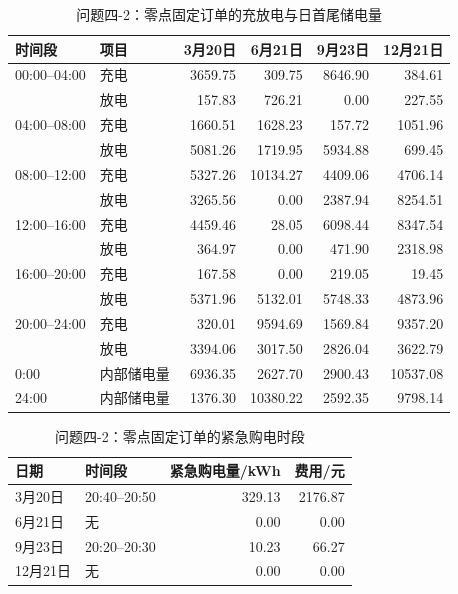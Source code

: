 \begin{table}[H]
\centering
\small
{}
\setlength{\tabcolsep}{5pt}
\caption{问题四-2：零点固定订单的充放电与日首尾储电量}
\label{tab:app42_storage}
\begin{tabular}{llrrrr}
\toprule
时间段 & 项目 & 3月20日 & 6月21日 & 9月23日 & 12月21日 \\
\midrule
00:00--04:00 & 充电 & 3659.75 & 309.75 & 8646.90 & 384.61 \\
 & 放电 & 157.83 & 726.21 & 0.00 & 227.55 \\
04:00--08:00 & 充电 & 1660.51 & 1628.23 & 157.72 & 1051.96 \\
 & 放电 & 5081.26 & 1719.95 & 5934.88 & 699.45 \\
08:00--12:00 & 充电 & 5327.26 & 10134.27 & 4409.06 & 4706.14 \\
 & 放电 & 3265.56 & 0.00 & 2387.94 & 8254.51 \\
12:00--16:00 & 充电 & 4459.46 & 28.05 & 6098.44 & 8347.54 \\
 & 放电 & 364.97 & 0.00 & 471.90 & 2318.98 \\
16:00--20:00 & 充电 & 167.58 & 0.00 & 219.05 & 19.45 \\
 & 放电 & 5371.96 & 5132.01 & 5748.33 & 4873.96 \\
20:00--24:00 & 充电 & 320.01 & 9594.69 & 1569.84 & 9357.20 \\
 & 放电 & 3394.06 & 3017.50 & 2826.04 & 3622.79 \\
0:00 & 内部储电量 & 6936.35 & 2627.70 & 2900.43 & 10537.08 \\
24:00 & 内部储电量 & 1376.30 & 10380.22 & 2592.35 & 9798.14 \\
\bottomrule
\end{tabular}
\end{table}

\begin{table}[H]
\centering
\small
{}
\setlength{\tabcolsep}{5pt}
\caption{问题四-2：零点固定订单的紧急购电时段}
\label{tab:app42_emergency}
\begin{tabular}{llrr}
\toprule
日期 & 时间段 & 紧急购电量/kWh & 费用/元 \\
\midrule
3月20日 & 20:40--20:50 & 329.13 & 2176.87 \\
6月21日 & 无 & 0.00 & 0.00 \\
9月23日 & 20:20--20:30 & 10.23 & 66.27 \\
12月21日 & 无 & 0.00 & 0.00 \\
\bottomrule
\end{tabular}
\end{table}

